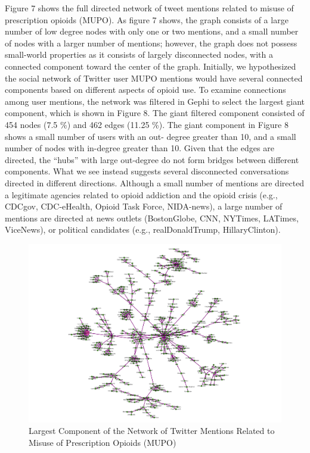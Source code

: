 \documentclass[sigconf]{acmart}
\begin{document}
Figure 7 shows the full directed network of tweet mentions related to misuse
of prescription opioids (MUPO). As figure 7 shows, the graph consists of a 
large number of low degree nodes with only one or two mentions, and a small 
number of nodes with a larger number of mentions; however, the graph does 
not possess small-world properties as it consists of largely disconnected 
nodes, with a connected component toward the center of the graph. 
Initially, we hypothesized the social network of Twitter user MUPO mentions 
would have several connected components based on different aspects of opioid use.  
To examine connections among user mentions, the network was filtered in Gephi 
to select the largest giant component, which is shown in Figure 8. The giant 
filtered component consisted of 454 nodes (7.5 \%) and 462 edges (11.25 \%). 
The giant component in Figure 8 shows a small number of users with an out-
degree greater than 10, and a small number of nodes with in-degree 
greater than 10. Given that the edges are directed, the ``hubs'' with 
large out-degree do not form bridges between different components. What we
see instead suggests several disconnected conversations directed in different
directions. Although a small number of mentions are directed a legitimate 
agencies related to opioid addiction and the opioid crisis (e.g., CDCgov, 
CDC-eHealth, Opioid Task Force, NIDA-news), a large number of mentions are 
directed at news outlets (BostonGlobe, CNN, NYTimes, LATimes, ViceNews), or 
political candidates (e.g., realDonaldTrump, HillaryClinton). 

\begin{figure}[!ht]
  \centering\includegraphics[width=\columnwidth]{images/Figure8.pdf}
  \caption{Largest Component of the Network of Twitter Mentions Related to 
  Misuse of Prescription Opioids (MUPO)}
  \label{f:Figure8}
\end{figure}
\end{document}
